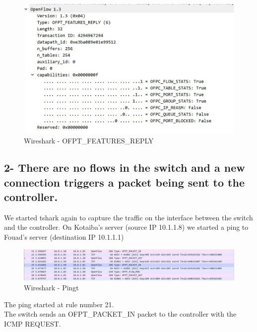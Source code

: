 \documentclass[a4paper]{article}
\begin{document}
\begin{figure}[h]
    \centering
    \includegraphics[scale=0.2]{images/OFPT_FEATURES_REPLY.jpg}
    \caption{Wireshark - OFPT\_FEATURES\_REPLY}
    \label{fig:tolopogy}
\end{figure}

\subsection{2- There are no flows in the switch and a new connection triggers a packet being sent to the controller.}

We started tshark again to capture the traffic on the interface between the switch and the controller. 
On Kotaiba's server (source IP 10.1.1.8) we started a ping to Fouad's server (destination IP 10.1.1.1)

\begin{figure}[h]
    \centering
    \includegraphics[scale=0.2]{images/ping.jpg}
    \caption{Wireshark - Pingt}
    \label{fig:tolopogy}
\end{figure}

The ping started at rule number 21.\\
The switch sends an OFPT\_PACKET\_IN packet to the controller with the ICMP REQUEST.
\end{document}
